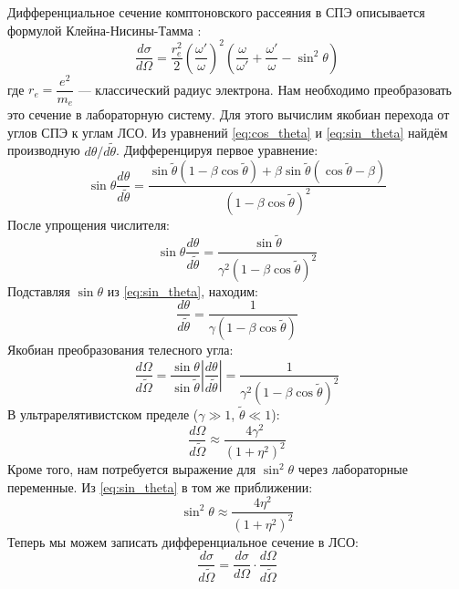 \documentclass[14pt, a4paper]{extreport}
\begin{document}
Дифференциальное сечение комптоновского рассеяния в СПЭ описывается формулой Клейна-Нисины-Тамма \cite{lifshitz}:
\begin{equation}
\label{eq:section}
    \frac{d\sigma}{d\Omega} = \frac{r_e^2}{2} \left( \frac{\omega'}{\omega} \right)^2 
    \left( \frac{\omega}{\omega'} + \frac{\omega'}{\omega} - \sin^2\theta \right)
\end{equation}
где $r_e = \dfrac{e^2}{m_e}$ --- классический радиус электрона.
Нам необходимо преобразовать это сечение в лабораторную систему. Для этого вычислим якобиан перехода от углов СПЭ к углам ЛСО.
Из уравнений \eqref{eq:cos_theta} и \eqref{eq:sin_theta} найдём производную $d\theta/d\tilde{\theta}$. 
Дифференцируя первое уравнение:
\begin{equation}
    \sin\theta \frac{d\theta}{d\tilde{\theta}} = \frac{\sin\tilde{\theta}(1-\beta\cos\tilde{\theta}) + \beta\sin\tilde{\theta}(\cos\tilde{\theta}-\beta)}{(1-\beta\cos\tilde{\theta})^2}
\end{equation}
После упрощения числителя:
\begin{equation}
    \sin\theta \frac{d\theta}{d\tilde{\theta}} = \frac{\sin\tilde{\theta}}{\gamma^2(1-\beta\cos\tilde{\theta})^2}
\end{equation}
Подставляя $\sin\theta$ из \eqref{eq:sin_theta}, находим:
\begin{equation}
    \frac{d\theta}{d\tilde{\theta}} = \frac{1}{\gamma(1-\beta\cos\tilde{\theta})}
\end{equation}
Якобиан преобразования телесного угла:
\begin{equation}
    \frac{d\Omega}{d\tilde{\Omega}} = \frac{\sin\theta}{\sin\tilde{\theta}} \left| \frac{d\theta}{d\tilde{\theta}} \right| 
    = \frac{1}{\gamma^2(1-\beta\cos\tilde{\theta})^2}
\end{equation}
В ультрарелятивистском пределе ($\gamma \gg 1$, $\tilde{\theta} \ll 1$):
\begin{equation}
    \frac{d\Omega}{d\tilde{\Omega}} \approx \frac{4\gamma^2}{(1+\eta^2)^2}
\end{equation}
Кроме того, нам потребуется выражение для $\sin^2\theta$ через лабораторные переменные. 
Из \eqref{eq:sin_theta} в том же приближении:
\begin{equation}
    \sin^2\theta \approx \frac{4\eta^2}{(1+\eta^2)^2}
\end{equation}
Теперь мы можем записать дифференциальное сечение в ЛСО:
\begin{equation}
    \frac{d\sigma}{d\tilde{\Omega}} = \frac{d\sigma}{d\Omega} \cdot \frac{d\Omega}{d\tilde{\Omega}}
\end{equation}
\end{document}
